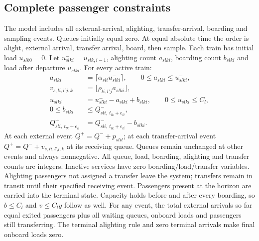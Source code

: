 \documentclass{article}
\begin{document}
\subsection*{Complete passenger constraints}
The model includes all external-arrival, alighting, transfer-arrival,
boarding and sampling events. Queues initially equal zero.
At equal absolute time the order is alight, external arrival, transfer
arrival, board, then sample. Each train has initial load $u_{slk0}=0$.
Let $u^-_{slki}=u_{slk,i-1}$, alighting count $a_{slki}$, boarding count
$b_{slki}$ and load after departure $u_{slki}$. For every active train:
\begin{align}
a_{slki}&=\lceil\alpha_{sli}u^-_{slki}\rceil,\qquad
0\le a_{slki}\le u^-_{slki},\\
v_{s,li,l'j,k}&=\lfloor\rho_{li,l'j}a_{slki}\rfloor,\\
u_{slki}&=u^-_{slki}-a_{slki}+b_{slki},\qquad0\le u_{slki}\le C_l,\\
0\le b_{slki}&\le Q^-_{sli,\ t_{lk}+e_{li}},\\
Q^+_{sli,\ t_{lk}+e_{li}}&=Q^-_{sli,\ t_{lk}+e_{li}}-b_{slki}.
\end{align}
At each external event $Q^+=Q^-+p_{slit}$; at each transfer-arrival
event $Q^+=Q^-+v_{s,li,l'j,k}$ at its receiving queue.
Queues remain unchanged at other events and always nonnegative.
All queue, load, boarding, alighting and transfer counts are integers.
Inactive services have zero boarding/load/transfer variables.
Alighting passengers not assigned a transfer leave the system; transfers
remain in transit until their specified receiving event. Passengers present at the horizon are carried into the terminal state. Capacity holds before and after every
boarding, so $b\le C_l$ and $v\le C_l y$ follow as well.
For any event, the total external arrivals so far equal exited passengers
plus all waiting queues, onboard loads and passengers still transferring.
The terminal alighting rule and zero terminal arrivals make final onboard
loads zero.
\end{document}
